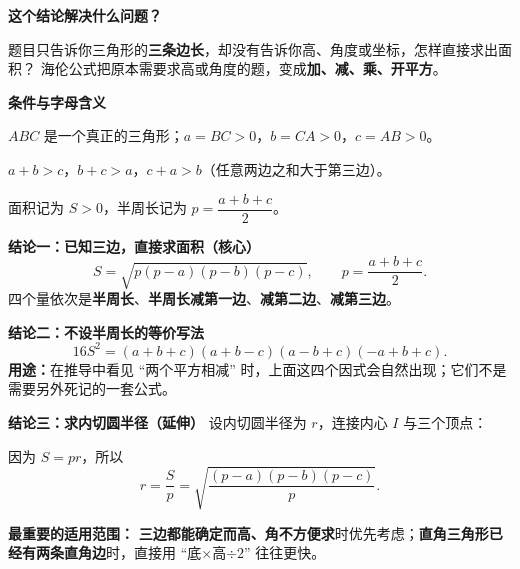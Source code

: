 
\begin{statementbox}
  \textbf{\textcolor{CStatement}{这个结论解决什么问题？}}

  题目只告诉你三角形的\textbf{三条边长}，却没有告诉你高、角度或坐标，怎样直接求出面积？
  海伦公式把原本需要求高或角度的题，变成\textbf{加、减、乘、开平方}。

  \medskip
  \textbf{\textcolor{CStatement}{条件与字母含义}}
  \begin{description}[style=nextline,leftmargin=2.8em,labelsep=0.5em,itemsep=0.35em]
    \item[\textbf{条件一：}] $ABC$ 是一个真正的三角形；$a=BC>0$，$b=CA>0$，$c=AB>0$。
    \item[\textbf{条件二：}] $a+b>c$，$b+c>a$，$c+a>b$（任意两边之和大于第三边）。
    \item[\textbf{记号：}] 面积记为 $S>0$，半周长记为 $p=\dfrac{a+b+c}{2}$。
  \end{description}

  \textbf{\textcolor{CStatement}{结论一：已知三边，直接求面积（核心）}}
  \[
    \boxed{\displaystyle S=\sqrt{p(p-a)(p-b)(p-c)},\qquad p=\frac{a+b+c}{2}.}
  \]
  四个量依次是\textbf{半周长}、\textbf{半周长减第一边}、\textbf{减第二边}、\textbf{减第三边}。

  \textbf{\textcolor{CStatement}{结论二：不设半周长的等价写法}}
  \[
   \boxed{\displaystyle 16S^2=(a+b+c)(a+b-c)(a-b+c)(-a+b+c).}
  \]
  \textbf{用途：}在推导中看见 ``两个平方相减'' 时，上面这四个因式会自然出现；它们不是需要另外死记的一套公式。

\par\noindent\begin{minipage}{\linewidth}
  \textbf{\textcolor{CStatement}{结论三：求内切圆半径（延伸）}}
  设内切圆半径为 $r$，连接内心 $I$ 与三个顶点：
\end{minipage}\par
  因为 $S=pr$，所以
  \[
    \boxed{\displaystyle r=\frac{S}{p}=\sqrt{\frac{(p-a)(p-b)(p-c)}{p}}.}
  \]

  \textbf{\textcolor{CStatement}{最重要的适用范围：}}
  \textbf{三边都能确定而高、角不方便求}时优先考虑；\textbf{直角三角形已经有两条直角边}时，直接用 ``底$\times$高$\div 2$'' 往往更快。
\end{statementbox}
